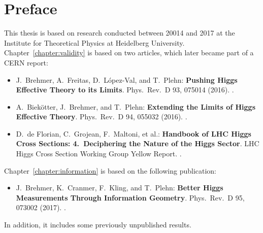 
\chapter*{Preface}
\label{chapter:preface}

This thesis is based on research conducted between 20014 and 2017 at
the Institute for Theoretical Physics at Heidelberg
University. Chapter~\ref{chapter:validity} is based on two articles,
which later became part of a CERN report:
%
\begin{itemize}
  \item[\cite{Brehmer:2015rna}] J.~Brehmer, A.~Freitas, D.~L\'opez-Val, and T.~Plehn:\newline
	\textbf{Pushing Higgs Effective Theory to its Limits}.\newline
	Phys.~Rev.~D 93, 075014 (2016). .
  \item[\cite{Biekotter:2016ecg}] A.~Biek\"otter, J.~Brehmer, and T.~Plehn:\newline
	\textbf{Extending the Limits of Higgs Effective Theory}.\newline
	Phys.~Rev.~D 94, 055032 (2016). . 
  \item[\cite{deFlorian:2016spz}] D.~de Florian, C.~Grojean, F.~Maltoni, et al.:\newline
        \textbf{Handbook of LHC Higgs Cross Sections: 4.~Deciphering the Nature of the Higgs Sector}.\newline
        LHC Higgs Cross Section Working Group Yellow Report. .
\end{itemize}
%
Chapter~\ref{chapter:information} is based on the following publication:
%
\begin{itemize}
  \item[\cite{Brehmer:2016nyr}] J.~Brehmer, K.~Cranmer, F.~Kling, and T.~Plehn:\newline
	\textbf{Better Higgs Measurements Through Information Geometry}.\newline
       Phys.~Rev.~D 95, 073002 (2017). .
\end{itemize}
%
In addition, it includes some previously unpublished results.

